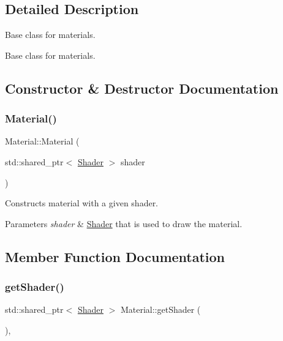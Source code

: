 \subsection{Detailed Description}
Base class for materials. 

Base class for materials. 

\subsection{Constructor \& Destructor Documentation}
\mbox{\label{class_material_a6c6dc52dccc57852a3763ed5a39028e5}} 
\subsubsection{\texorpdfstring{Material()}{Material()}}
{\footnotesize\ttfamily Material\+::\+Material (\begin{DoxyParamCaption}\item[{std\+::shared\+\_\+ptr$<$ \mbox{\hyperlink{class_shader}{Shader}} $>$}]{shader }\end{DoxyParamCaption})}

Constructs material with a given shader.


\begin{DoxyParams}{Parameters}
{\em shader} & \mbox{\hyperlink{class_shader}{Shader}} that is used to draw the material. \\
\hline
\end{DoxyParams}


\subsection{Member Function Documentation}
\mbox{\label{class_material_af71678b4a7b47e3b2b7f018318d6c4c6}} 
\subsubsection{\texorpdfstring{getShader()}{getShader()}}
{\footnotesize\ttfamily std\+::shared\+\_\+ptr$<$ \mbox{\hyperlink{class_shader}{Shader}} $>$ Material\+::get\+Shader (\begin{DoxyParamCaption}{ }\end{DoxyParamCaption})\hspace{0.3cm}{\ttfamily [final]}, {\ttfamily [virtual]}}

